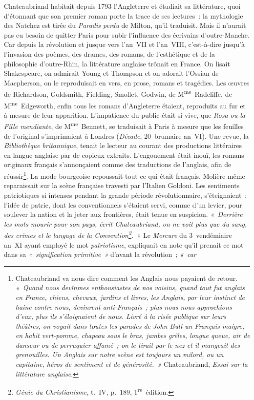 \documentclass[french,twoside]{book} %
\begin{document}
Chateaubriand habitait depuis 1793 l’Angleterre et étudiait sa littérature, quoi d’étonnant que son premier roman porte la trace de ses  
\label{p600}lectures : la mythologie des Natchez est tirée du \emph{Paradis perdu} de Milton, qu’il traduisit. Mais il n’aurait pas eu besoin de quitter Paris pour subir l’influence des écrivains d’outre-Manche. Car depuis la révolution et jusque vers l’an VII et l’an VIII, c’est-à-dire jusqu’à l’invasion des poèmes, des drames, des romans, de l’esthétique et de la philosophie d’outre-Rhin, la littérature anglaise trônait en France. On lisait Shakespeare, on admirait Young et Thompson et on adorait l’Ossian de Macpherson, on le reproduisait en vers, en prose, romans et tragédies. Les œuvres de Richardson, Goldsmith, Fielding, Smollet, Godwin, de M\textsuperscript{me} Radcliffe, de M\textsuperscript{me} Edgeworth, enfin tous les romans d’Angleterre étaient, reproduits au fur et à mesure de leur apparition. L’impatience du public était si vive, que \emph{Rosa ou la Fille mendiante}, de M\textsuperscript{me} Bennett, se traduisait à Paris à mesure que les feuilles de l’original s’imprimaient à Londres (\emph{Décade}, 20 brumaire an VI). Une revue, la \emph{Bibliothèque britannique}, tenait le lecteur au courant des productions littéraires en langue anglaise par de copieux extraits. L’engouement était inouï, les romans originaux français s’annonçaient comme des traductions de l’anglais, afin de réussir\footnote{Chateaubriand va nous dire comment les Anglais nous payaient de retour. \emph{« Quand nous devînmes enthousiastes de nos voisins, quand tout fut anglais en France, chiens, chevaux, jardins et livres, les Anglais, par leur instinct de haine contre nous, devinrent anti-Français ; plus nous nous approchions d’eux, plus ils s’éloignaient de nous. Livré à la risée publique sur leurs théâtres, on voyait dans toutes les parades de John Bull un Français maigre, en habit vert-pomme, chapeau sous le bras, jambes grêles, longue queue, air de danseur ou de perruquier affamé ; on le tirait par le nez et il mangeait des grenouilles. Un Anglais sur notre scène est toujours un milord, ou un capitaine, héros de sentiment et de générosité. »} Chateaubriand, \emph{Essai sur la littérature anglaise}.}. La mode bourgeoise repoussait tout ce qui était français. Molière même reparaissait sur la scène française travesti par l’Italien Goldoni. Les sentiments patriotiques si intenses pendant la grande période révolutionnaire, s’éteignaient ; l’idée de patrie, dont les conventionnels s’étaient servi, comme d’un levier, pour soulever la nation et la jeter aux frontières, était tenue en suspicion. \emph{« Derrière les mots {\itshape mourir pour son pays}, écrit Chateaubriand, on ne voit plus que du sang, des crimes et le langage de la Convention\footnote{\emph{Génie du Christianisme}, t. IV, p. 189, 1\textsuperscript{re} édition.}. »} Le \emph{Mercure} du 3 vendémiaire an XI ayant employé le mot {\itshape patriotisme}, expliquait en note qu’il prenait ce mot dans sa \emph{« signification primitive »} d’avant la révolution ; \emph{« car  
}
\end{document}
